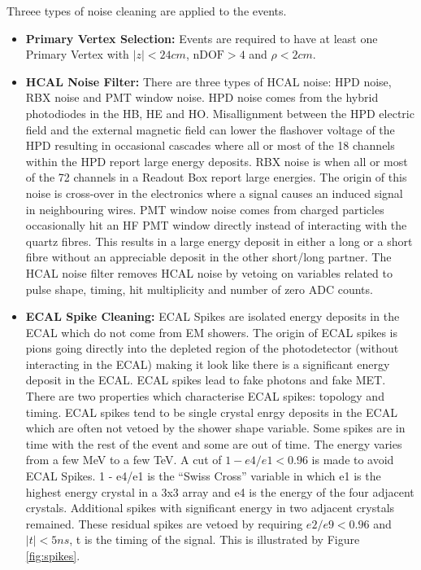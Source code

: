 Threee types of noise cleaning are applied to the events. 
\begin{itemize}
\item {\bf Primary Vertex Selection:} Events are required to have at least one
Primary Vertex with $|z| < 24\unit{cm}$, $\mbox{nDOF} > 4$ and $\rho <
2\unit{cm}$.
\item {\bf HCAL Noise Filter:} There are three types of HCAL noise: HPD noise, 
RBX noise and PMT window noise. HPD noise comes from the hybrid photodiodes in
the HB, HE and HO. Misallignment between the HPD electric field and the external
magnetic field can lower the flashover voltage of the HPD resulting in 
occasional cascades where all or most of the 18 channels within the HPD report
large energy deposits. RBX noise is when all or most of the 72 channels in a
Readout Box report large energies. The origin of this noise is cross-over in the
electronics where a signal causes an induced signal in neighbouring wires.
PMT window noise comes from charged particles occasionally hit an HF PMT window 
directly instead of interacting with the quartz fibres. This results in a large 
energy deposit in either a long or a short fibre without an appreciable deposit 
in the other short/long partner. The HCAL noise filter removes HCAL noise by 
vetoing on variables related to pulse shape, timing, hit multiplicity and number
of zero ADC counts.
\item {\bf ECAL Spike Cleaning:} ECAL Spikes are isolated energy deposits in 
the ECAL which do not come from EM showers. The origin of ECAL spikes is pions
going directly into the depleted region of the photodetector (without
interacting in the ECAL) making it look like there is a significant energy 
deposit in the ECAL. ECAL spikes lead to fake photons and fake MET. There are 
two properties which characterise ECAL spikes: topology and timing. ECAL spikes 
tend to be single crystal enrgy deposits in the ECAL which are often not vetoed 
by the shower shape variable. Some spikes are in time with the rest of the event 
and some are out of time. The energy varies from a few MeV to a few TeV. A 
cut of $1 - e4/e1 < 0.96$ is made to avoid ECAL Spikes. 1 - e4/e1 is the ``Swiss 
Cross'' variable in which e1 is the highest energy crystal in a 3x3 array and e4 
is the energy of the four adjacent crystals. Additional spikes with significant
energy in two adjacent crystals remained. These residual spikes are vetoed by
requiring $e2/e9 < 0.96$ and $|t| < 5\unit{ns}$, t is the timing of the signal. This 
is illustrated by Figure \ref{fig:spikes}.
\end{itemize}

